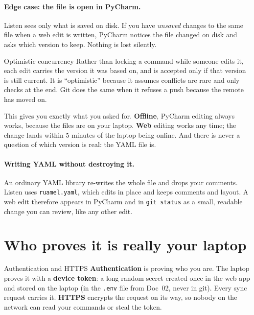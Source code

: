 \documentclass[11pt,a4paper]{article}
\begin{document}
\paragraph{Edge case: the file is open in PyCharm.} Listen sees only what is saved on disk. If
you have \emph{unsaved} changes to the same file when a web edit is written, PyCharm notices the
file changed on disk and asks which version to keep. Nothing is lost silently.

\begin{concept}{Optimistic concurrency}
Rather than locking a command while someone edits it, each edit carries the version it was
based on, and is accepted only if that version is still current. It is ``optimistic'' because
it assumes conflicts are rare and only checks at the end. Git does the same when it refuses a
push because the remote has moved on.
\end{concept}

\begin{why}
This gives you exactly what you asked for. \textbf{Offline}, PyCharm editing always works,
because the files are on your laptop. \textbf{Web} editing works any time; the change lands
within 5 minutes of the laptop being online. And there is never a question of which version is
real: the YAML file is.
\end{why}

\paragraph{Writing YAML without destroying it.} An ordinary YAML library re-writes the whole
file and drops your comments. Listen uses \texttt{ruamel.yaml}, which edits in place and keeps
comments and layout. A web edit therefore appears in PyCharm and in \texttt{git status} as a
small, readable change you can review, like any other edit.

\section{Who proves it is really your laptop}

\begin{concept}{Authentication and HTTPS}
\textbf{Authentication} is proving who you are. The laptop proves it with a \textbf{device
token}: a long random secret created once in the web app and stored on the laptop (in the
\texttt{.env} file from Doc~02, never in git). Every sync request carries it. \textbf{HTTPS}
encrypts the request on its way, so nobody on the network can read your commands or steal the
token.
\end{concept}
\end{document}
